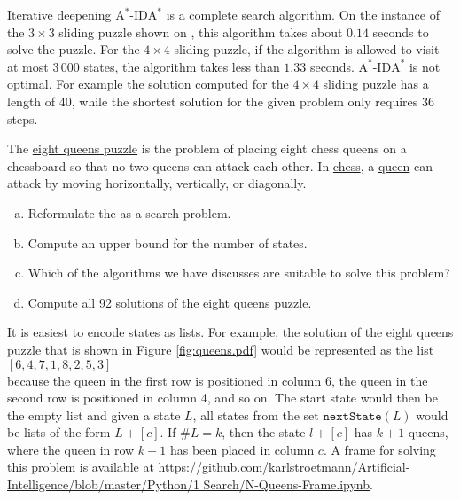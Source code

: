 Iterative deepening $\mathrm{A}^*$-$\mathrm{IDA}^*$ is a complete search algorithm.
On the instance of the $3 \times 3$ sliding puzzle shown on , this
algorithm takes about $0.14$ seconds to solve the puzzle.  For the $4 \times 4$ sliding puzzle, if the algorithm
is allowed to visit at most $3\,000$ states, the algorithm takes less than $1.33$ seconds.
 $\mathrm{A}^*$-$\mathrm{IDA}^*$ is not optimal.  For example the solution computed for 
the $4 \times 4$ sliding puzzle has a length of 40, while the shortest solution for the given problem only
requires 36 steps.


\exercise
The \href{https://en.wikipedia.org/wiki/Eight_queens_puzzle}{eight queens puzzle} is the problem of  placing
eight chess queens on a chessboard so that no two queens can attack each other.  In
\href{https://en.wikipedia.org/wiki/Chess}{chess}, a \href{https://en.wikipedia.org/wiki/Queen_(chess)}{queen}
can attack by moving horizontally, vertically, or diagonally.  
\begin{enumerate}[(a)]
\item Reformulate the  as a search problem.
\item Compute an upper bound for the number of states.
\item Which of the algorithms we have discusses are suitable to solve this problem?
\item Compute all 92 solutions of the eight queens puzzle.  
\end{enumerate}

\hint
It is easiest to encode states as lists.  For example, the solution of the eight queens puzzle that is shown in
Figure \ref{fig:queens.pdf} would be represented as the list 
\\[0.2cm]
\hspace*{1.3cm}
$[6, 4, 7, 1, 8, 2, 5, 3]$
\\[0.2cm]
because the queen in the first row is positioned in column 6, the queen in the second row is positioned in
column 4, and so on.  The start state would then be the empty list and given a state $L$, all states from the
set $\mathtt{nextState}(L)$ would be lists of the form $L + [c]$.  If $\#L = k$, then the state $l + [c]$ has
$k+1$ queens, where the queen in row $k+1$ has been placed in column $c$.
A frame for solving this problem is available at
\href{https://github.com/karlstroetmann/Artificial-Intelligence/blob/master/Python/1
  Search/N-Queens-Frame.ipynb}{https://github.com/karlstroetmann/Artificial-Intelligence/blob/master/Python/1 Search/N-Queens-Frame.ipynb}.



